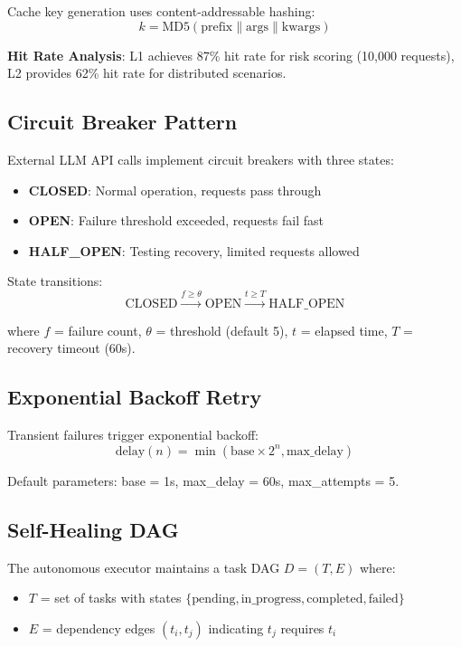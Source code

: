 \documentclass[conference]{IEEEtran}
\begin{document}
Cache key generation uses content-addressable hashing:
\begin{equation}
k = \text{MD5}(\text{prefix} \parallel \text{args} \parallel \text{kwargs})
\end{equation}

\textbf{Hit Rate Analysis}: L1 achieves 87\% hit rate for risk scoring (10,000 requests), L2 provides 62\% hit rate for distributed scenarios.

\subsection{Circuit Breaker Pattern}

External LLM API calls implement circuit breakers with three states:

\begin{itemize}
    \item \textbf{CLOSED}: Normal operation, requests pass through
    \item \textbf{OPEN}: Failure threshold exceeded, requests fail fast
    \item \textbf{HALF\_OPEN}: Testing recovery, limited requests allowed
\end{itemize}

State transitions:
\begin{equation}
\text{CLOSED} \xrightarrow{f \geq \theta} \text{OPEN} \xrightarrow{t \geq T} \text{HALF\_OPEN}
\end{equation}

where $f$ = failure count, $\theta$ = threshold (default 5), $t$ = elapsed time, $T$ = recovery timeout (60s).

\subsection{Exponential Backoff Retry}

Transient failures trigger exponential backoff:
\begin{equation}
\text{delay}(n) = \min(\text{base} \times 2^n, \text{max\_delay})
\end{equation}

Default parameters: base = 1s, max\_delay = 60s, max\_attempts = 5.

\subsection{Self-Healing DAG}

The autonomous executor maintains a task DAG $D = (T, E)$ where:
\begin{itemize}
    \item $T$ = set of tasks with states $\{\text{pending}, \text{in\_progress}, \text{completed}, \text{failed}\}$
    \item $E$ = dependency edges $(t_i, t_j)$ indicating $t_j$ requires $t_i$
\end{itemize}
\end{document}
